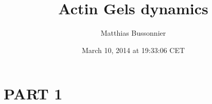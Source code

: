 \documentclass[A4paperpaper,11pt,english]{sphinxmanual}
\title{Actin Gels dynamics}
\date{March 10, 2014 at 19:33:06 CET}
\author{Matthias Bussonnier}
\begin{document}
\maketitle

\tableofcontents
\cleardoublepage
\pagestyle{normal}
 
\label{index-latex::doc}



\chapter{PART 1}
\label{parts/part1::doc}\label{parts/part1:contents}\label{parts/part1:part-1}
\end{document}
